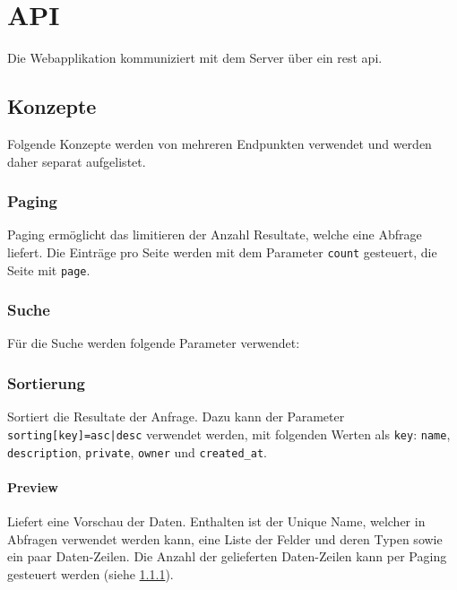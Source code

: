 \section{API}
Die Webapplikation kommuniziert mit dem Server über ein \gls{rest} \gls{api}.

\subsection{Konzepte}
Folgende Konzepte werden von mehreren Endpunkten verwendet und werden daher separat aufgelistet.

\subsubsection{Paging} \label{sec:pd:api-paging} 
Paging ermöglicht das limitieren der Anzahl Resultate, welche eine Abfrage liefert. Die Einträge pro Seite werden mit dem Parameter \texttt{count} gesteuert, die Seite mit \texttt{page}.

\subsubsection{Suche} \label{sec:pd:api-search} 
Für die Suche werden folgende Parameter verwendet:

\subsubsection{Sortierung} \label{sec:pd:api-sort}
Sortiert die Resultate der Anfrage. Dazu kann der Parameter \texttt{sorting[key]=asc|desc} verwendet werden, mit folgenden Werten als \texttt{key}: \texttt{name}, \texttt{description}, \texttt{private}, \texttt{owner} und \texttt{created\_at}.

\paragraph{Preview} \label{sec:pd:api-preview}
Liefert eine Vorschau der Daten. Enthalten ist der Unique Name, welcher in Abfragen verwendet werden kann, eine Liste der Felder und deren Typen sowie ein paar Daten-Zeilen. Die Anzahl der gelieferten Daten-Zeilen kann per Paging gesteuert werden (siehe \cref{sec:pd:api-paging}).

